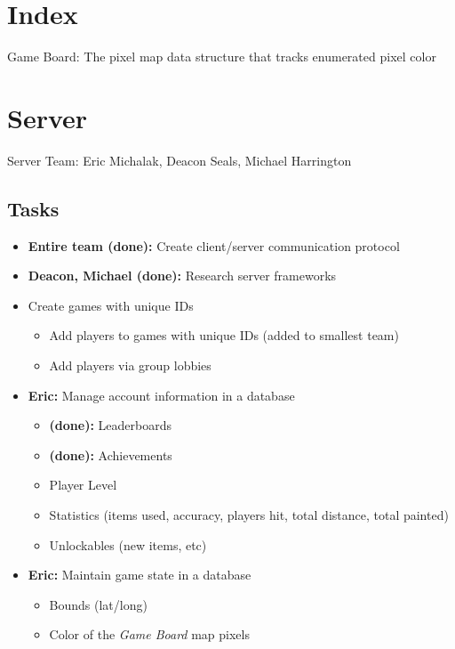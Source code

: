 \documentclass[oneside,12pt]{scrbook}
\begin{document}


\tableofcontents
\clearpage
\chapter{Index}
Game Board: The pixel map data structure that tracks enumerated pixel color

\chapter{Server}
Server Team: Eric Michalak, Deacon Seals, Michael Harrington

\section{Tasks}
\begin{itemize}
    \item \textbf{Entire team (done):} Create client/server communication protocol
    \item \textbf{Deacon, Michael (done):} Research server frameworks
    \item Create games with unique IDs
        \begin{itemize}
            \item Add players to games with unique IDs (added to smallest team)
            \item Add players via group lobbies
        \end{itemize}
    \item \textbf{Eric:} Manage account information in a database
        \begin{itemize}
            \item \textbf{(done):} Leaderboards
            \item \textbf{(done):} Achievements
            \item Player Level
            \item Statistics (items used, accuracy, players hit, total distance, total painted)
            \item Unlockables (new items, etc)
        \end{itemize}
    \item \textbf{Eric:} Maintain game state in a database
        \begin{itemize}
            \item Bounds (lat/long)
            \item Color of the \emph{Game Board} map pixels

\end{itemize}
\end{itemize}
\end{document}
